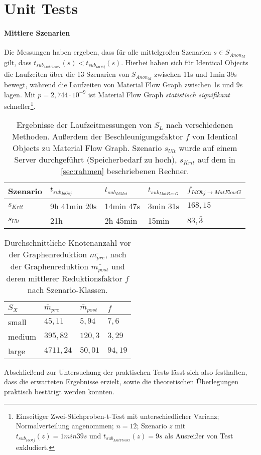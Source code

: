 \chapter{Unit Tests} \label{sec:results}


\subsubsection{Mittlere Szenarien}



Die Messungen haben ergeben, dass für alle mittelgroßen Szenarien $s \in S_{Anon_M}$ gilt, dass $t_{sub_{MatFlowG}}(s) < t_{sub_{IdObj}}(s)$. Hierbei haben sich für Identical Objects die Laufzeiten über die 13 Szenarien von $S_{Anon_M}$ zwischen 11s und 1min 39s bewegt, während die Laufzeiten von Material Flow Graph zwischen 1s und 9s lagen. Mit $p=2,744 \cdot 10^{-9}$ ist Material Flow Graph \textit{statistisch signifikant} schneller\footnote{Einseitiger Zwei-Stichproben-t-Test mit unterschiedlicher Varianz; Normalverteilung angenommen; $n=12$; Szenario $z$ mit $t_{sub_{IdObj}}(z) = 1min 39s$ und $t_{sub_{MatFlowG}}(z) = 9s$ als Ausreißer von Test exkludiert.}. 

\begin{table}[ht]
	\centering
	\begin{tabular}{l|l|l|l|l}
		Szenario & $t_{sub_{IdObj}}$ & $t_{sub_{IdMat}}$& $t_{sub_{MatFlowG}}$ & $f_{IdObj \rightarrow MatFlowG}$ \\
		\midrule
		$s_{Krit}$ & 9h 41min 20s & 14min 47s & 3min 31s & $168,15$ \\
		$s_{Ult}$ & 21h & 2h 45min & 15min & $83,\bar{3}$ \\
		
	\end{tabular}
	\caption{Ergebnisse der Laufzeitmessungen von $S_L$ nach verschiedenen Methoden. Außerdem der Beschleunigungsfaktor $f$ von Identical Objects zu Material Flow Graph. Szenario $s_{Ult}$ wurde auf einem Server durchgeführt (Speicherbedarf zu hoch), $s_{Krit}$ auf dem in \autoref{sec:rahmen} beschriebenen Rechner.}
	\label{tab:large_scenarios}
\end{table}

\begin{table}[ht]
	\centering
	\begin{tabular}{l|l|l|l}
		$S_X$ & $\bar{m}_{pre}$ & $\bar{m}_{post}$& $f$ \\
		\midrule
		small & $45,11$ & $5,94$ & $7,6$ \\
		medium & $395,82$ & $120,3$ & $3,29$ \\
		large & $4711,24$ & $50,01$ & $94,19$ \\
	\end{tabular}
	\caption{Durchschnittliche Knotenanzahl vor der Graphenreduktion $\bar{m_{pre}}$, nach der Graphenreduktion $\bar{m_{post}}$ und deren mittlerer Reduktionsfaktor $f$ nach Szenario-Klassen.}
	\label{tab:scenarios_node_nb}
\end{table}
Abschließend zur Untersuchung der praktischen Tests lässt sich also festhalten, dass die erwarteten Ergebnisse erzielt, sowie die theoretischen Überlegungen praktisch bestätigt werden konnten.